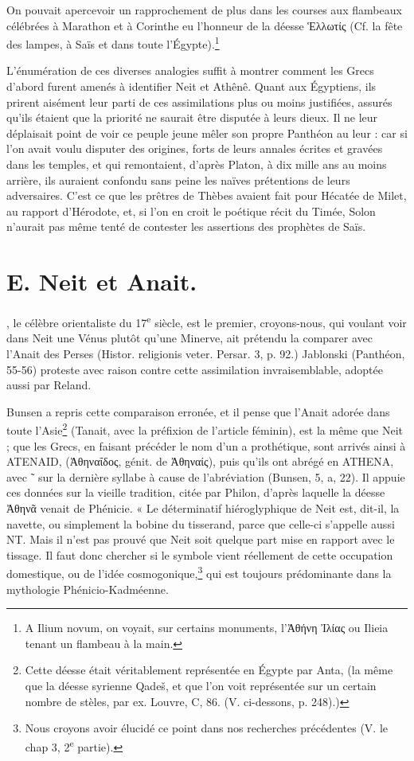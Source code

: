 \documentclass[letterpaper,twocolumn,openany,nodeprecatedcode]{dndbook}
\begin{document}
On pouvait apercevoir un rapprochement de plus dans les courses aux flambeaux célébrées à Marathon et à Corinthe eu l'honneur de la déesse Ἑλλωτίς (Cf. la fête des lampes, à Saïs et dans toute l'Égypte).\footnote{A Ilium novum, on voyait, sur certains monuments, l'Ἀθήνη Ἰλίας ou Ilieia tenant un flambeau à la main.}

L'énumération de ces diverses analogies suffit à montrer comment les Grecs d'abord furent amenés à identifier Neit et Athênê. Quant aux Égyptiens, ils prirent aisément leur parti de ces assimilations plus ou moins justifiées, assurés qu'ils étaient que la priorité ne saurait être disputée à leurs dieux. Il ne leur déplaisait point de voir ce peuple jeune mêler son propre Panthéon au leur : car si l'on avait voulu disputer des origines, forts de leurs annales écrites et gravées dans les temples, et qui remontaient, d'après Platon, à dix mille ans au moins arrière, ils auraient confondu sans peine les naïves prétentions de leurs adversaires. C'est ce que les prêtres de Thèbes avaient fait pour Hécatée de Milet, au rapport d'Hérodote, et, si l'on en croit le poétique récit du Timée, Solon n'aurait pas même tenté de contester les assertions des prophètes de Saïs.
\clearpage
\section{E. Neit et Anait.}
, le célèbre orientaliste du 17\textsuperscript{e} siècle, est le premier, croyons-nous, qui voulant voir dans Neit une Vénus plutôt qu'une Minerve, ait prétendu la comparer avec l'Anait des Perses (Histor. religionis veter. Persar. 3, p. 92.) Jablonski (Panthéon, 55-56) proteste avec raison contre cette assimilation invraisemblable, adoptée aussi par Reland.

Bunsen a repris cette comparaison erronée, et il pense que l'Anait adorée dans toute l'Asie\footnote{Cette déesse était véritablement représentée en Égypte par Anta, (la même que la déesse syrienne Qadeš, et que l'on voit représentée sur un certain nombre de stèles, par ex. Louvre, C, 86. (V. ci-dessons, p. 248).)} (Tanait, avec la préfixion de l'article féminin), est la même que Neit ; que les Grecs, en faisant précéder le nom d'un a prothétique, sont arrivés ainsi à ATENAID, (Ἀθηναΐδος, génit. de Ἀθηναίς), puis qu'ils ont abrégé en ATHENA, avec ῀ sur la dernière syllabe à cause de l'abréviation (Bunsen, 5, a, 22). Il appuie ces données sur la vieille tradition, citée par Philon, d'après laquelle la déesse Ἀθηνᾶ venait de Phénicie. « Le déterminatif hiéroglyphique de Neit est, dit-il, la navette, ou simplement la bobine du tisserand, parce que celle-ci s'appelle aussi NT. Mais il n'est pas prouvé que Neit soit quelque part mise en rapport avec le tissage. Il faut donc chercher si le symbole vient réellement de cette occupation domestique, ou de l'idée cosmogonique,\footnote{Nous croyons avoir élucidé ce point dans nos recherches précédentes (V. le chap 3, 2\textsuperscript{e} partie).} qui est toujours prédominante dans la mythologie Phénicio-Kadméenne.
\end{document}

